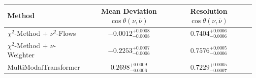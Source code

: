     \begin{tabular}{lccc}
        \toprule
        Method & Mean Deviation $\cos\theta(\nu, \bar{\nu})$ & Resolution $\cos\theta(\nu, \bar{\nu})$ \\
        \midrule
        $\chi^2$-Method + $\nu^2$-Flows & $-0.0012^{+0.0008}_{-0.0008}$ & $0.7404^{+0.0006}_{-0.0006}$ \\
        $\chi^2$-Method + $\nu$-Weighter & $-0.2253^{+0.0007}_{-0.0006}$ & $0.7576^{+0.0005}_{-0.0006}$ \\
        MultiModalTransformer & $0.2698^{+0.0009}_{-0.0006}$ & $0.7229^{+0.0005}_{-0.0007}$ \\
        \bottomrule
    \end{tabular}